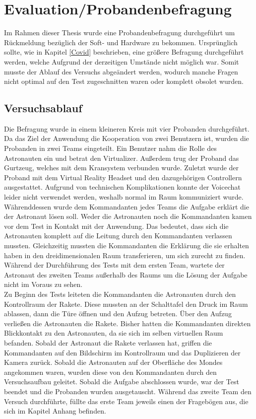 \section{Evaluation/Probandenbefragung} \label{Evaluation}
Im Rahmen dieser Thesis wurde eine Probandenbefragung durchgeführt um Rückmeldung bezüglich der Soft- und Hardware zu bekommen. Ursprünglich sollte, wie in Kapitel \ref{Covid} beschrieben, eine größere Befragung durchgeführt werden, welche Aufgrund der derzeitigen Umstände nicht möglich war. Somit musste der Ablauf des Versuchs abgeändert werden, wodurch manche Fragen nicht optimal auf den Test zugeschnitten waren oder komplett obsolet wurden. 

\subsection{Versuchsablauf}
Die Befragung wurde in einem kleineren Kreis mit vier Probanden durchgeführt. Da das Ziel der Anwendung die Kooperation von zwei Benutzern ist, wurden die Probanden in zwei Teams eingeteilt. Ein Benutzer nahm die Rolle des Astronauten ein und betrat den Virtualizer. Außerdem trug der Proband das Gurtzeug, welches mit dem Kransystem verbunden wurde. Zuletzt wurde der Proband mit dem Virtual Reality Headset und den dazugehörigen Controllern ausgestattet. Aufgrund von technischen Komplikationen konnte der Voicechat leider nicht verwendet werden, weshalb normal im Raum kommuniziert wurde.\\

Währenddessen wurde dem Kommandanten jedes Teams die Aufgabe erklärt die der Astronaut lösen soll. Weder die Astronauten noch die Kommandanten kamen vor dem Test in Kontakt mit der Anwendung. Das bedeutet, dass sich die Astronauten komplett auf die Leitung durch den Kommandanten verlassen mussten. Gleichzeitig mussten die Kommandanten die Erklärung die sie erhalten haben in den dreidimensionalen Raum transferieren, um sich zurecht zu finden. Während der Durchführung des Tests mit dem ersten Team, wartete der Astronaut des zweiten Teams außerhalb des Raums um die Lösung der Aufgabe nicht im Voraus zu sehen.\\

Zu Beginn des Tests leiteten die Kommandanten die Astronauten durch den Kontrollraum der Rakete. Diese mussten an der Schalttafel den Druck im Raum ablassen, dann die Türe öffnen und den Aufzug betreten. Über den Aufzug verließen die Astronauten die Rakete. Bisher hatten die Kommandanten direkten Blickkontakt zu den Astronauten, da sie sich im selben virtuellen Raum befanden. Sobald der Astronaut die Rakete verlassen hat, griffen die Kommandanten auf den Bildschirm im Kontrollraum und das Duplizieren der Kamera zurück. Sobald die Astronauten auf der Oberfläche des Mondes angekommen waren, wurden diese von den Kommandanten durch den Versuchsaufbau geleitet. Sobald die Aufgabe abschlossen wurde, war der Test beendet und die Probanden wurden ausgetauscht. Während das zweite Team den Versuch durchführte, füllte das erste Team jeweils einen der Fragebögen aus, die sich im Kapitel Anhang befinden. 


